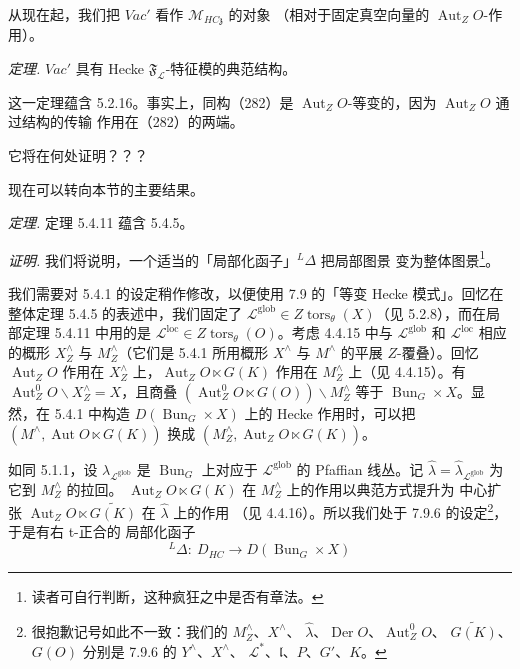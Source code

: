 从现在起，我们把 $\mathit{Vac}'$ 看作 $\mathcal{M}_{HC\mathfrak{z}}$ 的对象
（相对于固定真空向量的 $\operatorname{Aut}_ZO$-作用）。

 \emph{定理.} $\mathit{Vac}'$ 具有 Hecke
$\mathfrak{F}_{\mathcal{L}}$-特征模的典范结构。

这一定理蕴含 5.2.16。事实上，同构（282）是
$\operatorname{Aut}_ZO$-等变的，因为 $\operatorname{Aut}_ZO$ 通过结构的传输
作用在（282）的两端。

它将在何处证明？？？

现在可以转向本节的主要结果。

 \emph{定理.} 定理 5.4.11 蕴含 5.4.5。

\emph{证明.} 我们将说明，一个适当的「局部化函子」${}^{L}\Delta$ 把局部图景
变为整体图景\footnote{读者可自行判断，这种疯狂之中是否有章法。}。

我们需要对 5.4.1 的设定稍作修改，以便使用 7.9 的「等变 Hecke 模式」。回忆在
整体定理 5.4.5 的表述中，我们固定了
$\mathcal{L}^{\mathrm{glob}}\in Z\operatorname{tors}_{\theta}(X)$（见 5.2.8），而在局部定理
5.4.11 中用的是 $\mathcal{L}^{\mathrm{loc}}\in Z\operatorname{tors}_{\theta}(O)$。考虑
4.4.15 中与 $\mathcal{L}^{\mathrm{glob}}$ 和 $\mathcal{L}^{\mathrm{loc}}$ 相应的概形
$X^{\wedge}_{Z}$ 与 $M^{\wedge}_{Z}$（它们是 5.4.1 所用概形 $X^{\wedge}$ 与
$M^{\wedge}$ 的平展 $Z$-覆叠）。回忆 $\operatorname{Aut}_ZO$ 作用在
$X^{\wedge}_{Z}$ 上，$\operatorname{Aut}_ZO\ltimes G(K)$ 作用在
$M^{\wedge}_{Z}$ 上（见 4.4.15）。有
$\operatorname{Aut}^{0}_{Z}O\backslash X^{\wedge}_{Z}=X$，且商叠
$(\operatorname{Aut}^{0}_{Z}O\ltimes G(O))\backslash M^{\wedge}_{Z}$ 等于
$\operatorname{Bun}_G\times X$。显然，在 5.4.1 中构造
$D(\operatorname{Bun}_G\times X)$ 上的 Hecke 作用时，可以把
$(M^{\wedge},\operatorname{Aut}O\ltimes G(K))$ 换成
$(M^{\wedge}_{Z},\operatorname{Aut}_ZO\ltimes G(K))$。

如同 5.1.1，设 $\lambda_{\mathcal{L}^{\mathrm{glob}}}$ 是 $\operatorname{Bun}_G$ 上对应于
$\mathcal{L}^{\mathrm{glob}}$ 的 Pfaffian 线丛。记
$\hat{\lambda}=\hat{\lambda}_{\mathcal{L}^{\mathrm{glob}}}$ 为它到 $M^{\wedge}_{Z}$ 的拉回。
$\operatorname{Aut}_ZO\ltimes G(K)$ 在 $M^{\wedge}_{Z}$ 上的作用以典范方式提升为
中心扩张 $\operatorname{Aut}_ZO\ltimes\widetilde{G(K)}$ 在 $\hat{\lambda}$ 上的作用
（见 4.4.16）。所以我们处于
7.9.6 的设定\footnote{很抱歉记号如此不一致：我们的 $M^{\wedge}_{Z}$、$X^{\wedge}$、
$\hat{\lambda}$、$\operatorname{Der}O$、$\operatorname{Aut}^{0}_{Z}O$、
$\widetilde{G(K)}$、$G(O)$ 分别是 7.9.6 的 $Y^{\wedge}$、$X^{\wedge}$、
$\mathcal{L}^{*}$、$\mathfrak{l}$、$P$、$G'$、$K$。}，于是有右 t-正合的
局部化函子
\[
{}^{L}\Delta:\ D_{HC}\to D(\operatorname{Bun}_G\times X)
\]


